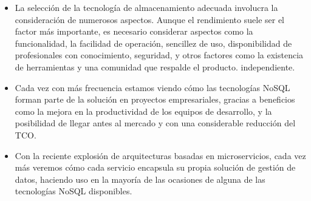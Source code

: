 \documentclass[%
 reprint,
 amsmath,amssymb,
 aps,
]{revtex4-1}
\begin{document}
\begin{itemize}
	\item La selección de la tecnología de almacenamiento adecuada involucra la consideración de numerosos aspectos. Aunque el rendimiento suele ser el factor más importante, es necesario considerar aspectos como la funcionalidad, la facilidad de operación, sencillez de uso, disponibilidad de profesionales con conocimiento, seguridad, y otros factores como la existencia de herramientas y una comunidad que respalde el producto. independiente.
	\item Cada vez con más frecuencia estamos viendo cómo las tecnologías NoSQL forman parte de la solución en proyectos empresariales, gracias a beneficios como la mejora en la productividad de los equipos de desarrollo, y la posibilidad de llegar antes al mercado y con una considerable reducción del TCO.
          \item Con la reciente explosión de arquitecturas basadas en microservicios, cada vez más veremos cómo cada servicio encapsula su propia solución de gestión de datos, haciendo uso en la mayoría de las ocasiones de alguna de las tecnologías NoSQL disponibles.
\end{itemize}


\end{document}

